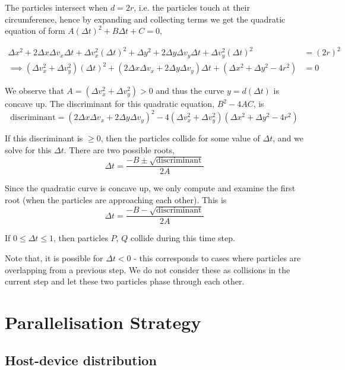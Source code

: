 \documentclass[12pt]{article}
\begin{document}
\begin{enumerate}
	The particles intersect when $d = 2r$, i.e. the particles touch at their circumference, hence by expanding and collecting terms we get the quadratic equation of form $A (\Delta t)^2 + B \Delta t + C = 0$,
	
	\begin{align*}
		\Delta x^2 + 2 \Delta x \Delta v_x \Delta t + \Delta v_x^2 (\Delta t)^2 + \Delta y^2 + 2 \Delta y \Delta v_y \Delta t + \Delta v_y^2 (\Delta t)^2 &= (2r)^2 \\
		\implies (\Delta v_x^2 + \Delta v_y^2) (\Delta t)^2 + (2 \Delta x \Delta v_x + 2 \Delta y \Delta v_y) \Delta t + (\Delta x^2 + \Delta y^2 - 4r^2) &= 0
	\end{align*}
	
	We observe that $A = (\Delta v_x^2 + \Delta v_y^2) > 0$ and thus the curve $y = d(\Delta t)$ is concave up. The discriminant for this quadratic equation, $B^2 - 4AC$, is
	$$\textrm{discriminant} = (2 \Delta x \Delta v_x + 2 \Delta y \Delta v_y)^2 - 4(\Delta v_x^2 + \Delta v_y^2)(\Delta x^2 + \Delta y^2 - 4r^2)$$
	
	If this discriminant is $\geq 0$, then the particles collide for some value of $\Delta t$, and we solve for this $\Delta t$. There are two possible roots,
	$$\Delta t = \frac{-B \pm \sqrt{\textrm{discriminant}}}{2A}$$
	
	Since the quadratic curve is concave up, we only compute and examine the first root (when the particles are approaching each other). This is
	$$\Delta t = \frac{-B - \sqrt{\textrm{discriminant}}}{2A}$$
	
	If $0 \leq \Delta t \leq 1$, then particles $P$, $Q$ collide during this time step.
	
	Note that, it is possible for $\Delta t < 0$ - this corresponds to cases where particles are overlapping from a previous step. We do not consider these as collisions in the current step and let these two particles phase through each other.
\end{enumerate} 

\pagebreak

\section{Parallelisation Strategy}

\subsection{Host-device distribution}
\end{document}
